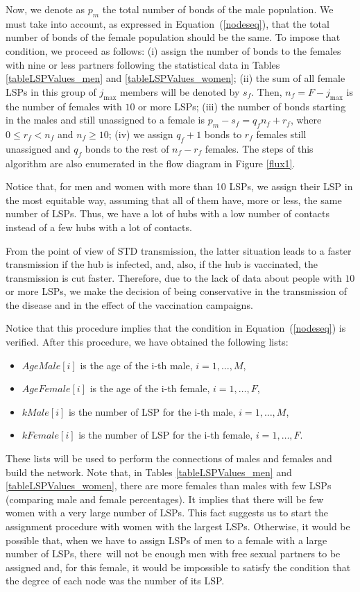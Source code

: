 Now, we denote as $p_m$ the total number of bonds of the male population. We must take into account, as expressed in Equation\
(\ref{nodeseq}), that the total number of bonds of the female population should be the same. To impose that condition, we
proceed as follows: (i) assign the number of bonds to the females with nine or less partners following the statistical 
data in Tables \ref{tableLSPValues_men} and \ref{tableLSPValues_women}; (ii) the sum of all female LSPs in this group of $j_{\mbox{max}}$ members will be denoted by $s_f$. 
Then, $n_f=F-j_{\mbox{max}}$ is the number of females with $10$ or more LSPs; (iii) the number of bonds starting in the males and still unassigned to a female is $p_m-s_f= q_f n_f + r_f$, where $0 \le r_f < n_f$ and $n_f \ge 10$; (iv) we assign $q_f+1$ bonds to $r_f$ females still unassigned and $q_f$ bonds to the rest of $n_f-r_f$ females. The steps of this algorithm are also enumerated in the flow diagram in Figure  \ref{flux1}.

Notice that, for men and women with more than 10 LSPs, we assign their LSP in the most equitable way, assuming that all of them have, more or less, the same number of LSPs. Thus, we have a lot of hubs with a low number of contacts instead of a few hubs with a lot of contacts.

From the point of view of STD transmission, the latter situation leads to a faster transmission if the hub is infected, and, also, if the hub is vaccinated, the transmission is cut faster. Therefore, due to the lack of data about people with $10$ or more LSPs, we make the decision of being conservative in the transmission of the disease and in the effect of the vaccination campaigns.

Notice that this procedure implies that the condition in Equation\ (\ref{nodeseq}) is verified. After this procedure, we have obtained the following lists:
\begin{itemize}[leftmargin=*,labelsep=5mm]
\item $AgeMale\left[ i \right]$ is the age of the i-th male, $i=1,\ldots,M$,
\item $AgeFemale\left[ i\right]$ is the age of the i-th female, $i=1,\ldots,F$,
\item $kMale\left[ i \right]$ is the number of LSP for the i-th male, $i=1,\ldots,M$,
\item $kFemale\left[ i \right]$ is the number of LSP for the i-th female, $i=1,\ldots,F$.
\end{itemize}

These lists will be used to perform the connections of males and females and build the network. Note that, in Tables \ref{tableLSPValues_men} and \ref{tableLSPValues_women}, there are more females than males with few LSPs (comparing male and female percentages). It implies that there will be few women with a very large number of LSPs. This fact suggests us to start the assignment procedure with women with the largest LSPs. Otherwise, it would be possible that, when we have to assign LSPs of men to a female with a large number of LSPs, there~will not be enough men with free sexual partners to be assigned and, for this female, it would be impossible to satisfy the condition that the degree of each node was the number of its LSP. 

